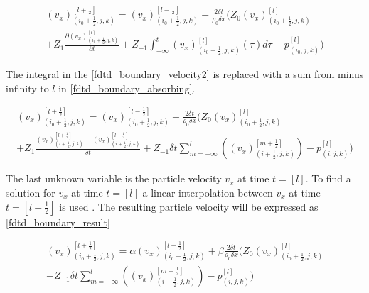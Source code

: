 \begin{multline}\label{fdtd_boundary_velocity}
(v_x)_{(i_0+\frac{1}{2},j,k)}^{[l+\frac{1}{2}]}= (v_x)_{(i_0+\frac{1}{2},j,k)}^{[l-\frac{1}{2}]}-\frac{2 \delta t}{\rho_0 \delta x} \Biggl( 
 Z_0(v_x)_{(i_0+\frac{1}{2},j,k)}^{[l]} \\
 +Z_1 \frac{\partial (v_x)_{(i_0+\frac{1}{2},j,k)}^{[l]}}{\partial t} +Z_{-1} \int_{-\infty}^{t} (v_x)_{(i_0+\frac{1}{2},j,k)}^{[l]}(\tau)d\tau -p_{(i_0,j,k)}^{[l]}
\Biggr)
\end{multline}

The integral in the \autoref{fdtd_boundary_velocity2} is replaced with a sum from minus infinity to $l$ in \autoref{fdtd_boundary_absorbing}.

\begin{multline}\label{fdtd_boundary_velocity2}
(v_x)_{(i_0+\frac{1}{2},j,k)}^{[l+\frac{1}{2}]}= (v_x)_{(i_0+\frac{1}{2},j,k)}^{[l-\frac{1}{2}]}-\frac{2 \delta t}{\rho_0 \delta x} \Biggl( 
 Z_0(v_x)_{(i_0+\frac{1}{2},j,k)}^{[l]} \\
+Z_1\frac{(v_x)_{(i+\frac{1}{2},j,k)}^{[l+\frac{1}{2}]}-(v_x)_{(i+\frac{1}{2},j,k)}^{[l-\frac{1}{2}]}}{\delta t}+Z_{-1} \delta t \sum_{m=-\infty}^{l} \left( (v_x)_{(i+\frac{1}{2},j,k)}^{[m+\frac{1}{2}]} \right) -p_{(i,j,k)}^{[l]}
\Biggr)
\end{multline}

The last unknown variable is the particle velocity $v_x$ at time $t=[l]$. To find a solution for $v_x$ at time  $t=[l]$  a linear interpolation between $v_x$ at time $t=[l \pm \frac{1}{2}]$ is used \citep{finiteproblems}. The resulting particle velocity will be expressed as \autoref{fdtd_boundary_result}

\begin{multline}\label{fdtd_boundary_result}
(v_x)_{(i_0+\frac{1}{2},j,k)}^{[l+\frac{1}{2}]}= \alpha (v_x)_{(i_0+\frac{1}{2},j,k)}^{[l-\frac{1}{2}]} + \beta \frac{2 \delta t}{\rho_0 \delta x} \Biggl( 
 Z_0(v_x)_{(i_0+\frac{1}{2},j,k)}^{[l]} \\
-Z_{-1} \delta t \sum_{m=-\infty}^{l} \left( (v_x)_{(i+\frac{1}{2},j,k)}^{[m+\frac{1}{2}]} \right) -p_{(i,j,k)}^{[l]}
\Biggr)
\end{multline}


         \startexplain
    \stopexplain



